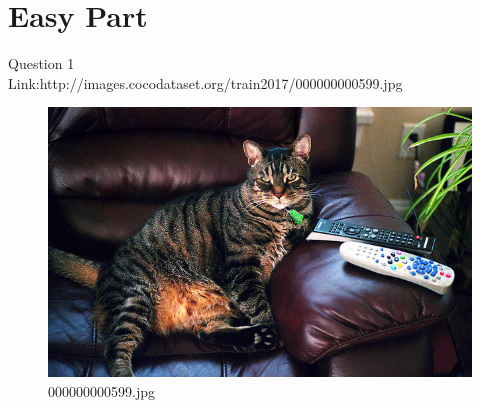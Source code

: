 \section{Easy Part}
Question 1\\
Link:http://images.cocodataset.org/train2017/000000000599.jpg
    \begin{figure}[h]
        \centering
        \includegraphics[width=0.8\linewidth]{../image set/easy/000000000599.jpg}
        \caption{000000000599.jpg}
    \end{figure}
